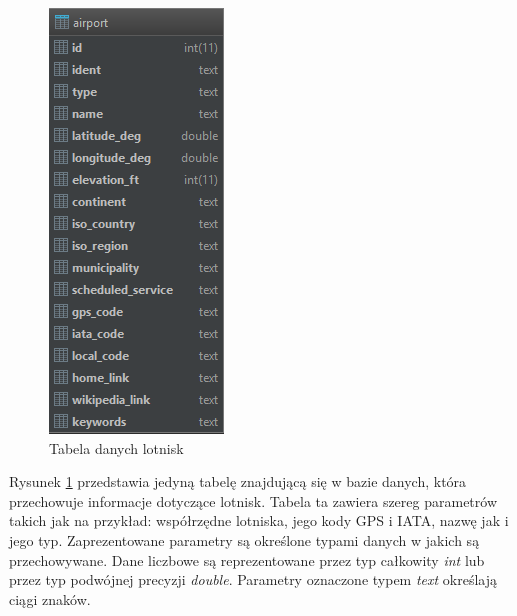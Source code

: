 \documentclass[12pt, twoside]{report}
\begin{document}
\begin{figure}[!ht]
\centering
\includegraphics[scale=1.00, keepaspectratio]{database.png}
\caption{Tabela danych lotnisk}
\label{fig:database}
\end{figure}

\noindent Rysunek \ref{fig:database} przedstawia jedyną tabelę znajdującą się w bazie danych, która przechowuje informacje dotyczące lotnisk. Tabela ta zawiera szereg parametrów takich jak na przykład: współrzędne lotniska, jego kody GPS i IATA, nazwę jak i jego typ. Zaprezentowane parametry są określone typami danych w jakich są przechowywane. Dane liczbowe są reprezentowane przez typ całkowity \textit{int} lub przez typ podwójnej precyzji \textit{double}. Parametry oznaczone typem \textit{text} określają ciągi znaków.

\end{document}
